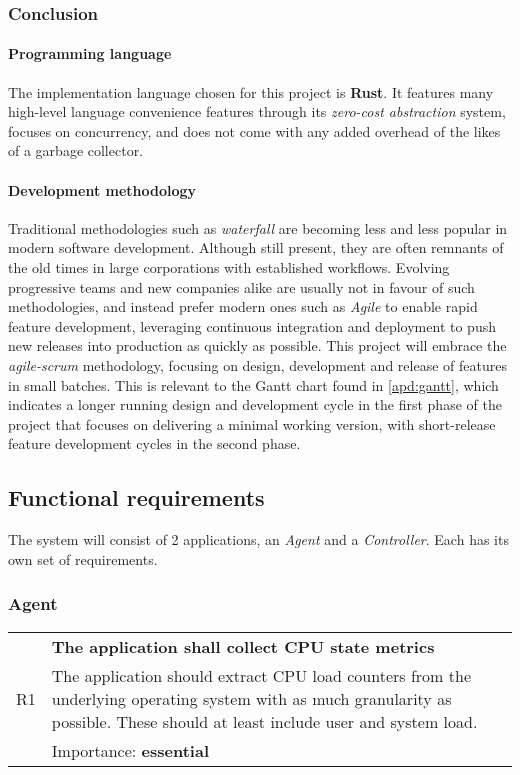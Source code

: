         \subsubsection{Conclusion}
            \paragraph{Programming language}
                The implementation language chosen for this project is \textbf{Rust}. It features many high-level language convenience features through its \textit{zero-cost abstraction} system, focuses on concurrency, and does not come with any added overhead of the likes of a garbage collector.

            \paragraph{Development methodology}
                Traditional methodologies such as \textit{waterfall} are becoming less and less popular in modern software development. Although still present, they are often remnants of the old times in large corporations with established workflows. Evolving progressive teams and new companies alike are usually not in favour of such methodologies, and instead prefer modern ones such as \textit{Agile} to enable rapid feature development, leveraging continuous integration and deployment to push new releases into production as quickly as possible. This project will embrace the \textit{agile-scrum} methodology, focusing on design, development and release of features in small batches. This is relevant to the Gantt chart found in \autoref{apd:gantt}, which indicates a longer running design and development cycle in the first phase of the project that focuses on delivering a minimal working version, with short-release feature development cycles in the second phase.

    \subsection{Functional requirements}
        The system will consist of 2 applications, an \textit{Agent} and a \textit{Controller}. Each has its own set of requirements.

        \subsubsection{Agent}
            \begin{tabular}{ p{0.7cm}|p{14.5cm} }
                \multirow{3}{*}{R1 } & \textbf{The application shall collect CPU state metrics}\\
                \cline{2-2}
                & The application should extract CPU load counters from the underlying operating system with as much granularity as possible. These should at least include user and system load.\\
                \cline{2-2}
                & Importance: \textbf{essential}
            \end{tabular}

